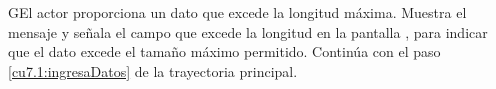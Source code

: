  \begin{UCtrayectoriaA}{G}{El actor proporciona un dato que excede la longitud máxima.}
    \UCpaso[\UCsist] Muestra el mensaje  y señala el campo que excede la 
    longitud en la pantalla , para indicar que el dato excede el tamaño máximo permitido.
    \UCpaso[] Continúa con el paso \ref{cu7.1:ingresaDatos} de la trayectoria principal.
 \end{UCtrayectoriaA}
 
 